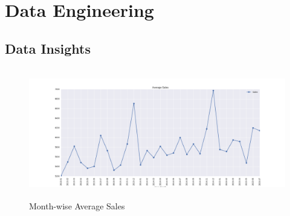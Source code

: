 \documentclass[12pt,a4paper]{article}
\begin{document}
\section{Data Engineering}

\subsection{Data Insights}
\label{di}
\begin{figure}[H]
	\centering
	\hspace*{-0.5in}
	\includegraphics[width=1.25\textwidth, height=2.24in]{images/MonthWiseAvgSales.png}
	\caption{Month-wise Average Sales}
	\label{fig:mwas}
\end{figure}
    
\end{document}
